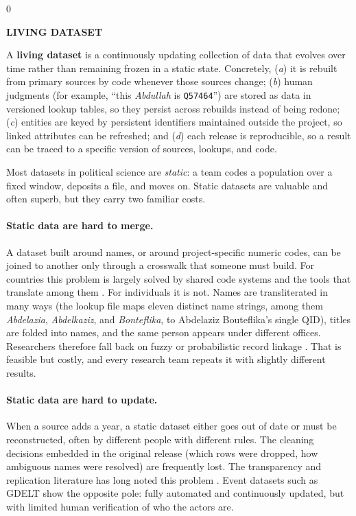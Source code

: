 \documentclass[11pt]{article}
\makeatletter
\renewcommand\section{\@startsection{section}{1}{\z@}{-3.0ex plus -1ex minus -.2ex}{1.5ex plus .2ex}{\normalfont\large\bfseries\MakeUppercase}}
\newenvironment{sidebar}[1]
  {\par\medskip\noindent\begin{lrbox}{0}\begin{minipage}{\dimexpr\linewidth-2\fboxsep\relax}\small\textbf{\MakeUppercase{#1}}\par\smallskip}
  {\end{minipage}\end{lrbox}\colorbox{sidebar}{\usebox{0}}\par\medskip}
\newcommand{\qid}[1]{\texttt{#1}}
\makeatother
\begin{document}
\section{What Is a Living Dataset?}\label{sec:living}

\begin{sidebar}{Living dataset}
A \textbf{living dataset} is a continuously updating collection of data that evolves over time rather than remaining frozen in a static state. Concretely, (\emph{a}) it is rebuilt from primary sources by code whenever those sources change; (\emph{b}) human judgments (for example, ``this \emph{Abdullah} is \qid{Q57464}'') are stored as data in versioned lookup tables, so they persist across rebuilds instead of being redone; (\emph{c}) entities are keyed by persistent identifiers maintained outside the project, so linked attributes can be refreshed; and (\emph{d}) each release is reproducible, so a result can be traced to a specific version of sources, lookups, and code.
\end{sidebar}

Most datasets in political science are \emph{static}: a team codes a population over a fixed window, deposits a file, and moves on. Static datasets are valuable and often superb, but they carry two familiar costs.

\paragraph{Static data are hard to merge.} A dataset built around names, or around project-specific numeric codes, can be joined to another only through a crosswalk that someone must build. For countries this problem is largely solved by shared code systems and the tools that translate among them \citep{arelbundock2018countrycode}. For individuals it is not. Names are transliterated in many ways (the lookup file maps eleven distinct name strings, among them \emph{Abdelazia}, \emph{Abdelkaziz}, and \emph{Bonteflika}, to Abdelaziz Bouteflika's single QID), titles are folded into names, and the same person appears under different offices. Researchers therefore fall back on fuzzy or probabilistic record linkage \citep{enamorado2019using}. That is feasible but costly, and every research team repeats it with slightly different results.

\paragraph{Static data are hard to update.} When a source adds a year, a static dataset either goes out of date or must be reconstructed, often by different people with different rules. The cleaning decisions embedded in the original release (which rows were dropped, how ambiguous names were resolved) are frequently lost. The transparency and replication literature has long noted this problem \citep{king1995replication,lupia2014openness}. Event datasets such as GDELT \citep{leetaru2013gdelt} show the opposite pole: fully automated and continuously updated, but with limited human verification of who the actors are.
\end{document}
